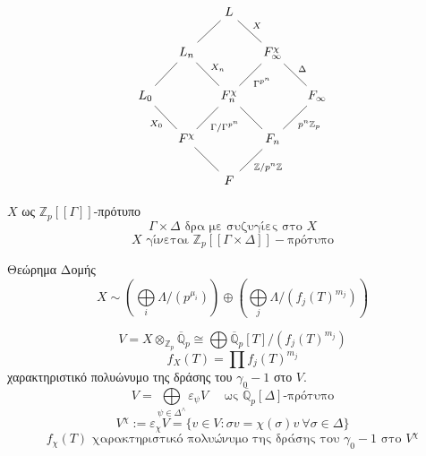 \documentclass{beamer}
\newcommand{\Q}{\mathbb{Q}}
\newcommand{\Z}{\mathbb{Z}}
\begin{document}
\begin{frame}

\[
\centering
    \begin{tikzcd}[ampersand replacement=\&, column sep=small]
        \&                                                                          \& L                                                                         \&                                                          \&                                         \\
        \& L_n \arrow[ru, no head]                                                  \&                                                                           \& F^\chi_\infty \arrow[lu, "X"', no head]                  \&                                         \\
L_0 \arrow[ru, no head] \&                                                                          \& F_n^\chi \arrow[lu, "X_n"', no head] \arrow[ru, "\Gamma^{p^n}"', no head] \&                                                          \& F_\infty \arrow[lu, "\Delta"', no head] \\
        \& F^\chi \arrow[lu, "X_0", no head] \arrow[ru, "\Gamma/\Gamma^{p^n}"', no head] \&                                                                           \& F_n \arrow[ru, "p^n \Z_p"', no head] \arrow[lu, no head] \&                                         \\
        \&                                                                          \& F \arrow[ru, "\Z/p^n\Z"', no head] \arrow[lu, no head]                    \&                                                          \&                                        
\end{tikzcd}
\]

\begin{block}{$X$ ως $\Z_p[[\Gamma]]$-πρότυπο}
$$\Gamma \times \Delta \text{ δρα με συζυγίες στο } X$$
$$X \text{ γίνεται } \Z_p[[\Gamma \times \Delta]]-\text{πρότυπο} $$
\end{block}
\end{frame}

\begin{frame}
\begin{block}{Θεώρημα Δομής}
    $$X \sim \left(\bigoplus\limits_i \Lambda/(p^{\mu_i})\right) \oplus \left(\bigoplus\limits_j \Lambda/(f_j(T)^{m_j})\right)$$
\end{block}
$$V = X \otimes_{\Z_p} \overline{\Q}_p \cong \bigoplus \overline{\Q}_p [T]/(f_j(T)^{m_j})$$
$$f_X(T) = \prod f_j(T)^{m_j}$$ χαρακτηριστικό πολυώνυμο της δράσης του $\gamma_0 -1$ στο $V$.
$$V = \bigoplus\limits_{\psi \in \Delta^\wedge} \varepsilon_\psi V \quad \text{ ως } \overline{\Q}_p [\Delta]\text{-πρότυπο}$$
$$V^\chi := \varepsilon_\chi V = \{v\in V: \sigma v = \chi(\sigma)v \ \forall \sigma \in \Delta\}$$
$$f_\chi(T) \text{ χαρακτηριστικό πολυώνυμο της δράσης του } \gamma_0 -1 \text{ στο } V^\chi$$


\end{frame}
\end{document}
